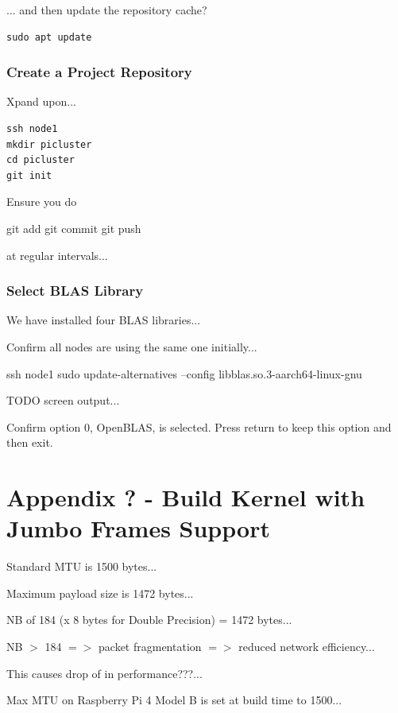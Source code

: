 \documentclass{article}
\begin{document}
... and then update the repository cache? 

\begin{lstlisting}[]
sudo apt update
\end{lstlisting}


\subsubsection{Create a Project Repository}

Xpand upon...

\begin{lstlisting}[]
ssh node1
mkdir picluster
cd picluster
git init
\end{lstlisting}

Ensure you do  

git add
git commit
git push

at regular intervals...



\subsubsection{Select BLAS Library}

We have installed four BLAS libraries...

Confirm all nodes are using the same one initially...

ssh node1
sudo update-alternatives --config libblas.so.3-aarch64-linux-gnu

TODO screen output...

Confirm option 0, OpenBLAS, is selected. Press return to keep this option and then exit.



%
%
\clearpage\section*{Appendix ? - Build Kernel with Jumbo Frames Support}

Standard MTU is 1500 bytes...

Maximum payload size is 1472 bytes...

NB of 184 (x 8 bytes for Double Precision) = 1472 bytes...

NB $>$ 184 $=>$ packet fragmentation $=>$ reduced network efficiency...

This causes drop of in performance???...

Max MTU on Raspberry Pi 4 Model B is set at build time to 1500...
\end{document}
